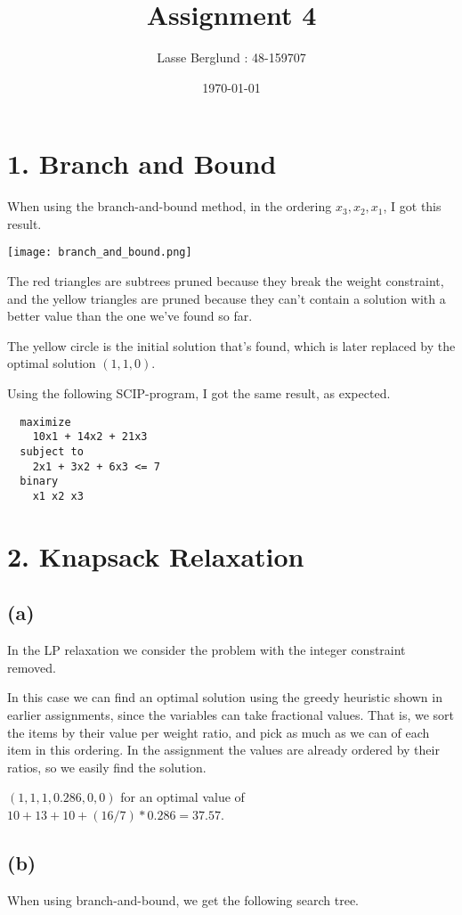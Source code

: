 \documentclass[12pt]{report}
\title{Assignment 4}
\author{Lasse Berglund : 48-159707}
\date{\today}
\begin{document}
\maketitle
\section*{1. Branch and Bound}
  When using the branch-and-bound method, in the ordering $x_3,x_2,x_1$, I got this result.

  \texttt{[image: branch\_and\_bound.png]}

  The red triangles are subtrees pruned because they break the weight constraint, and the yellow triangles are pruned because they can't contain a solution with a better value than the one we've found so far.

  The yellow circle is the initial solution that's found, which is later replaced by the optimal solution $(1,1,0)$.

  Using the following SCIP-program, I got the same result, as expected.

  \begin{verbatim}
  maximize
    10x1 + 14x2 + 21x3
  subject to
    2x1 + 3x2 + 6x3 <= 7
  binary
    x1 x2 x3
  \end{verbatim}


\section*{2. Knapsack Relaxation}
  \subsection*{(a)}
    In the LP relaxation we consider the problem with the integer constraint removed.

    In this case we can find an optimal solution using the greedy heuristic shown in earlier assignments, since the variables can take fractional values. That is, we sort the items by their value per weight ratio, and pick as much as we can of each item in this ordering. In the assignment the values are already ordered by their ratios, so we easily find the solution.

    $(1,1,1,0.286,0,0)$ for an optimal value of $10+13+10+(16/7)*0.286 = 37.57$. 
  
  \subsection*{(b)}
    When using branch-and-bound, we get the following search tree.
\end{document}
